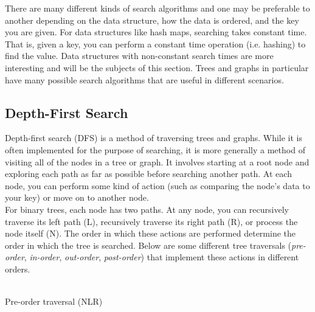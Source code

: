 There are many different kinds of search algorithms and one may be preferable to another depending on the data structure, how the data is ordered, and the key you are given. For data structures like hash maps, searching takes constant time. That is, given a key, you can perform a constant time operation (i.e. hashing) to find the value. Data structures with non-constant search times are more interesting and will be the subjects of this section. Trees and graphs in particular have many possible search algorithms that are useful in different scenarios.


\subsection{Depth-First Search}

Depth-first search (DFS) is a method of traversing trees and graphs. While it is often implemented for the purpose of searching, it is more generally a method of visiting all of the nodes in a tree or graph. It involves starting at a root node and exploring each path as far as possible before searching another path. At each node, you can perform some kind of action (such as comparing the node's data to your key) or move on to another node. \\

For binary trees, each node has two paths. At any node, you can recursively traverse its left path (L), recursively traverse its right path (R), or process the node itself (N). The order in which these actions are performed determine the order in which the tree is searched. Below are some different tree traversals (\textit{pre-order}, \textit{in-order}, \textit{out-order}, \textit{post-order}) that implement these actions in different orders. \\\\

\begin{algorithm}[H]
	\caption{Pre-order traversal (NLR)}
\end{algorithm}
\vspace{5mm}

